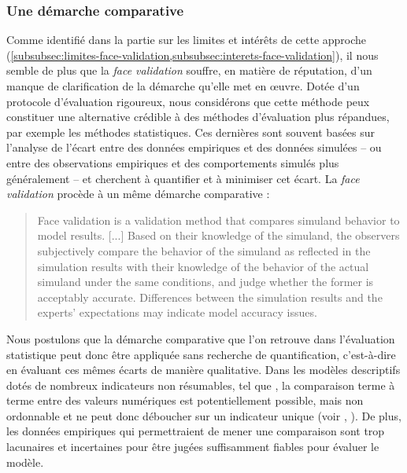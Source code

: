 \subsubsection{Une démarche comparative}
Comme identifié dans la partie sur les limites et intérêts de cette approche (\cref{subsubsec:limites-face-validation,subsubsec:interets-face-validation}), il nous semble de plus que la \textit{face validation} souffre, en matière de réputation, d'un manque de clarification de la démarche qu'elle met en œuvre.
Dotée d'un protocole d'évaluation rigoureux, nous considérons que cette méthode peux constituer une alternative crédible à des méthodes d'évaluation plus répandues, par exemple les méthodes statistiques.
Ces dernières sont souvent basées sur l'analyse de l'écart entre des données empiriques et des données simulées -- ou entre des observations empiriques et des comportements simulés plus généralement -- et cherchent à quantifier et à minimiser cet écart.
La \textit{face validation} procède à un même démarche comparative :
\begin{quotation}
		\noindent \og Face validation is a validation method that compares simuland behavior to model results. [...] Based on their knowledge of the simuland, the observers subjectively compare the behavior of the simuland as reflected in the simulation results with their knowledge of the behavior of the actual simuland under the same conditions, and judge whether the former is acceptably accurate. Differences between the simulation results and the experts' expectations may indicate model accuracy issues.
	\mbox{}~ \hfill \textcite[341]{petty2010verification}
\end{quotation}
Nous postulons que la démarche comparative que l'on retrouve dans l'évaluation statistique peut donc être appliquée sans recherche de quantification, c'est-à-dire en évaluant ces mêmes écarts de manière qualitative.
Dans les modèles descriptifs dotés de nombreux indicateurs non résumables, tel que \simfeodal{}, la comparaison terme à terme entre des valeurs numériques est potentiellement possible, mais non ordonnable et ne peut donc déboucher sur un indicateur unique (voir , ).
De plus, les données empiriques qui permettraient de mener une comparaison sont trop lacunaires et incertaines pour être jugées suffisamment fiables pour évaluer le modèle.

